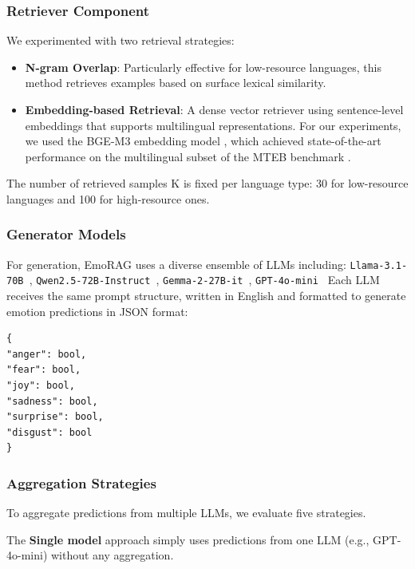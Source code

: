 \documentclass[a4paper,12pt]{extarticle}
\begin{document}
\subsubsection{Retriever Component}

We experimented with two retrieval strategies:
\begin{itemize}
\item \textbf{N-gram Overlap}: Particularly effective for low-resource languages, this method retrieves examples based on surface lexical similarity.
\item \textbf{Embedding-based Retrieval}: A dense vector retriever using sentence-level embeddings that supports multilingual representations. For our experiments, we used the BGE-M3 embedding model \cite{chen2024bgem3embeddingmultilingualmultifunctionality}, which achieved state-of-the-art performance on the multilingual subset of the MTEB benchmark \cite{muennighoff2023mtebmassivetextembedding}.
\end{itemize}

The number of retrieved samples K is fixed per language type: 30 for low-resource languages and 100 for high-resource ones.

\subsubsection{Generator Models}

For generation, EmoRAG uses a diverse ensemble of LLMs including:
\texttt{Llama-3.1-70B \cite{grattafiori2024llama3herdmodels}}, \texttt{Qwen2.5-72B-Instruct \cite{yang2024qwen2technicalreport}}, \texttt{Gemma-2-27B-it \cite{gemmateam2024gemma2improvingopen}}, \texttt{GPT-4o-mini \cite{openai2024gpt4omini}}
Each LLM receives the same prompt structure, written in English and formatted to generate emotion predictions in JSON format:
\begin{verbatim}
{
"anger": bool,
"fear": bool,
"joy": bool,
"sadness": bool,
"surprise": bool,
"disgust": bool
}
\end{verbatim}

\subsubsection{Aggregation Strategies}

To aggregate predictions from multiple LLMs, we evaluate five strategies. 

The \textbf{Single model} approach simply uses predictions from one LLM (e.g., GPT-4o-mini) without any aggregation. 
\end{document}
